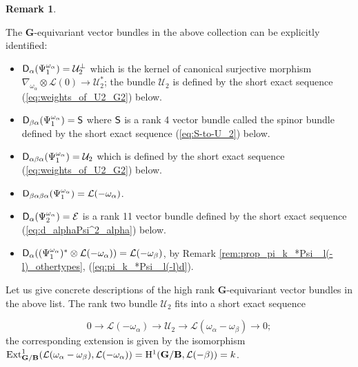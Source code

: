 \documentclass[sn-mathphys-num]{sn-jnl}%
\newcommand{\Uu}{\mathcal U}
\newcommand{\Ee}{\mathcal E}
\newcommand{\Ll}{\mathcal L}
\newcommand{\Ext}{{\mathrm{Ext}}}
\newcommand{\bg}{\mathbf G}
\newcommand{\fb}{\mathbf B}
\theoremstyle{definition}
\newtheorem{remark}[theorem]{Remark}
\begin{document}
\begin{remark}\label{rem:identG_2}
{
The  $ \bg$-equivariant vector bundles in the above collection can be explicitly identified: 

\begin{itemize}[(1)]

\item[(1)] ${\sf D}_{\alpha}(\Psi _1^{\omega _{\alpha}}) = \Uu _2^{\perp}$ which is the kernel of canonical surjective morphism $\nabla _{\omega _{\alpha}}\otimes \Ll (0)\rightarrow \Uu _2^{\ast}$; the bundle $\Uu _2$ is defined by the short exact sequence (\ref{eq:weights_of_U2_G2}) below. 

\item[(2)] ${\sf D}_{\beta\alpha}(\Psi _1^{\omega _{\alpha}}) = {\sf S}$ where ${\sf S}$ is a rank 4 vector bundle called the spinor bundle defined by the short exact sequence (\ref{eq:S-to-U_2}) below. 

\item[(3)] ${\sf D}_{\alpha\beta\alpha}(\Psi _1^{\omega _{\alpha}}) = \Uu _2$ which is defined by the short exact sequence (\ref{eq:weights_of_U2_G2}) below. 

\item[(4)] ${\sf D}_{\beta\alpha\beta\alpha}(\Psi _1^{\omega _{\alpha}}) = \Ll (-\omega _{\alpha})$.
 
\item[(5)] ${\sf D}_{\alpha}(\Psi _2^{\omega _{\alpha}})=\Ee$ is a rank 11 vector bundle defined by the short exact sequence (\ref{eq:d_alphaPsi^2_alpha}) below.

\item[(6)] ${\sf D}_{\alpha}((\Psi _1^{\omega _{\alpha}})^{\ast}\otimes \Ll (-\omega _{\alpha}))=\Ll (-\omega _{\beta})$, by Remark \ref{rem:prop_pi_k_*Psi _l(-l)_othertypes}, (\ref{eq:pi_k_*Psi _l(-l)d}).

\end{itemize}

Let us give concrete descriptions of the high rank $ \bg$-equivariant vector bundles in the above list. The rank two bundle $\Uu _2$ fits into a short exact sequence 

\begin{equation}\label{eq:weights_of_U2_G2}
0\rightarrow \Ll (-\omega _{\alpha})\rightarrow \Uu _2\rightarrow \Ll (\omega _{\alpha}-\omega _{\beta})\rightarrow 0;
\end{equation}
the corresponding extension is given by the isomorphism $\Ext ^1_{ \bg/\fb}(\Ll (\omega _{\alpha}-\omega _{\beta}),\Ll (-\omega _{\alpha}))={\rm H}^1( \bg/ \fb,\Ll (-\beta))=k$. 
}
\end{remark}
\end{document}
